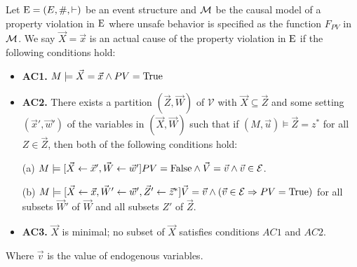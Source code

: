 \begin{definition}
    Let $\mathrm{E} = (E,\#,\vdash)$ be an event structure and
    $\mathcal{M}$ be the causal model of a property violation in
    $\mathrm{E}$ where unsafe behavior is specified as the
    function $F_{PV}$ in $\mathcal{M}$.
    We say $\vec X = \vec x$ is an actual cause of 
    the property violation in $\mathrm{E}$ if the following
    conditions hold:
    \begin{itemize}
        \item  \textbf{AC1.} $M\models \vec X = \vec x
                  \wedge PV = \mathrm{True}$
        \item  \textbf{AC2. }There exists a partition $(\vec Z, \vec W)$ of $\mathcal{V}$ with $\vec X \subseteq \vec Z$ and some setting $(\vec x',\vec w')$ of the variables in $(\vec X,\vec W)$ such that if $(M,\vec u)\models \vec Z = z^*$ for all $Z\in \vec Z$, then both of the following conditions hold:

              (a) $M \models[\vec X \leftarrow \vec x', \vec W \leftarrow \vec w']
                  PV = \mathrm{False}
                  \wedge \vec V = \vec v
                  \wedge  \vec v \in \mathcal{E}$.

              (b) $M \models[\vec X\leftarrow \vec x, \vec W' \leftarrow \vec w', \vec Z'\leftarrow \vec z^*]
                  \vec V = \vec v
                  \wedge 
                  (\vec v \in \mathcal{E} \Rightarrow PV = \mathrm{True})
                  $
              for all subsets $\vec W'$ of $\vec W$ and all subsets $Z'$ of $\vec Z$.

        \item  \textbf{AC3.} $\vec X$ is minimal; no subset of $\vec X$ satisfies conditions $AC1$ and $AC2$.
    \end{itemize}
    Where $\vec v$ is the value of endogenous variables.
\end{definition}
\pagebreak

